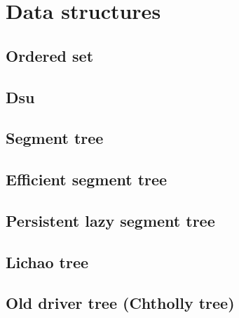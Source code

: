 \section{Data structures}


\subsection{Ordered set}

\subsection{Dsu}


\subsection{Segment tree}

\subsection{Efficient segment tree}

\subsection{Persistent lazy segment tree}

\subsection{Lichao tree}

\subsection{Old driver tree (Chtholly tree)}

